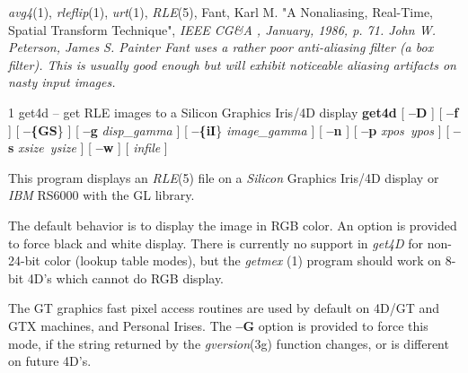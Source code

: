 {\it avg4}{\rm (1),}
{\it rleflip}{\rm (1),}
{\it urt}{\rm (1),}
{\it RLE}{\rm (5),}
\nwl
Fant, Karl M. "A Nonaliasing, Real-Time, Spatial Transform Technique",
%
\it IEEE CG\&A\rm%
, January, 1986, p. 71.
John W. Peterson,
James S. Painter
{\it Fant}
uses a rather poor anti-aliasing filter (a box filter).  This is usually
good enough but will exhibit noticeable aliasing artifacts on nasty
input images.
\newpage


%
%
%
 1
get4d -- get RLE images to a Silicon Graphics Iris/4D display
{\bf get4d}
[
{\bf --D}
] [
{\bf --f}
] [
{\bf --\{GS}\}
] [
{\bf --g}
{\it disp\_gamma}
] [
{\bf --\{iI}\}
{\it image\_gamma}
] [
{\bf --n}
] [
{\bf --p}
{\it xpos\ ypos}
] [
{\bf --s}
{\it xsize\ ysize}
] [
{\bf --w}
] [ 
{\it infile}
]

This program displays an
{\it RLE}{\rm (5)}
file on a
{\it Silicon} Graphics Iris/4D
display or
{\it IBM} RS6000
with the GL library.

The default behavior is to display the image in RGB color.  An option is
provided to force black and white display.  There is currently no support in
{\it get4D}
for non-24-bit color (lookup table modes), but the
{\it getmex} (1)
program should work on 8-bit 4D's which cannot do RGB display.

The GT graphics fast pixel access routines are used by default on 4D/GT and
GTX machines, and Personal Irises.  The
{\bf --G}
option is provided to force this mode, if the string returned by the
{\it gversion}{\rm (3g)}
function changes, or is different on future 4D's.

